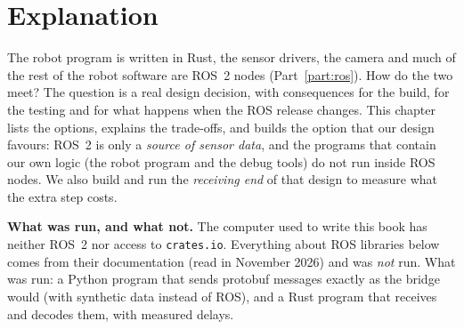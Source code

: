 \label{ch:rust11}

\section*{Explanation}
The robot program is written in Rust, the sensor drivers, the camera and much of the rest of the robot software are ROS~2 nodes (Part~\ref{part:ros}). How do the two meet? The question is a real design decision, with consequences for the build, for the testing and for what happens when the ROS release changes. This chapter lists the options, explains the trade-offs, and builds the option that our design favours: ROS~2 is only a \emph{source of sensor data}, and the programs that contain our own logic (the robot program and the debug tools) do not run inside ROS nodes. We also build and run the \emph{receiving end} of that design to measure what the extra step costs.

\textbf{What was run, and what not.} The computer used to write this book has neither ROS~2 nor access to \verb!crates.io!. Everything about ROS libraries below comes from their documentation (read in November 2026) and was \emph{not} run. What was run: a Python program that sends protobuf messages exactly as the bridge would (with synthetic data instead of ROS), and a Rust program that receives and decodes them, with measured delays.

